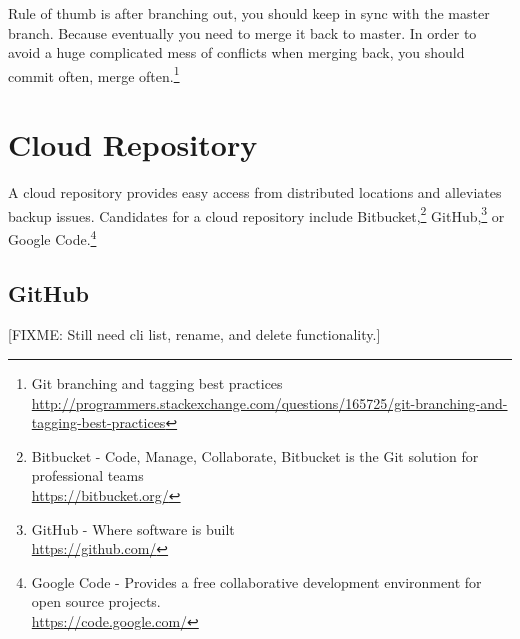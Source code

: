 \documentclass[12pt,letterpaper,dvips]{article}
\newcommand{\FIXME}[1]{\textsf{[FIXME: #1]}}
\begin{document}
\noindent Rule of thumb is after branching out, you should keep in sync with
the master branch. Because eventually you need to merge it back to master. In
order to avoid a huge complicated mess of conflicts when merging back, you
should commit often, merge often.\footnote{Git branching and tagging best
practices\\
\href{http://programmers.stackexchange.com/questions/165725/git-branching-and-tagging-best-practices}{http://programmers.stackexchange.com/questions/165725/git-branching-and-tagging-best-practices}}


\newpage
\section{Cloud Repository}
A cloud repository provides easy access from distributed
locations and alleviates backup issues.  Candidates for
a cloud repository include Bitbucket,\footnote{Bitbucket - Code, Manage, Collaborate,
Bitbucket is the Git solution for professional teams\\
\href{https://bitbucket.org/}{https://bitbucket.org/}}
GitHub,\footnote{GitHub - Where software is built\\
\href{https://github.com/}{https://github.com/}}
or Google Code.\footnote{Google Code - Provides a free collaborative development environment
for open source projects.\\
\href{https://code.google.com/}{https://code.google.com/}}


\subsection{GitHub}

\FIXME{Still need cli list, rename, and delete functionality.}
\end{document}
